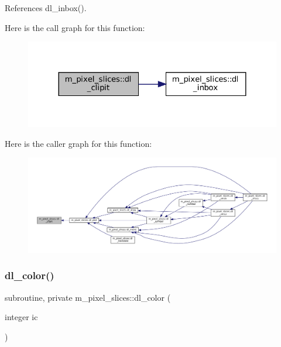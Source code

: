 References dl\+\_\+inbox().

Here is the call graph for this function\+:\nopagebreak
\begin{figure}[H]
\begin{center}
\leavevmode
\includegraphics[width=324pt]{namespacem__pixel__slices_af0a3aeaa17e192568cb6a69a3b3eeab6_cgraph}
\end{center}
\end{figure}
Here is the caller graph for this function\+:\nopagebreak
\begin{figure}[H]
\begin{center}
\leavevmode
\includegraphics[width=350pt]{namespacem__pixel__slices_af0a3aeaa17e192568cb6a69a3b3eeab6_icgraph}
\end{center}
\end{figure}
\mbox{\label{namespacem__pixel__slices_a8e362bf8eea80faddc97f7d137c95f9c}} 
\subsubsection{\texorpdfstring{dl\+\_\+color()}{dl\_color()}}
{\footnotesize\ttfamily subroutine, private m\+\_\+pixel\+\_\+slices\+::dl\+\_\+color (\begin{DoxyParamCaption}\item[{integer}]{ic }\end{DoxyParamCaption})\hspace{0.3cm}{\ttfamily [private]}}



